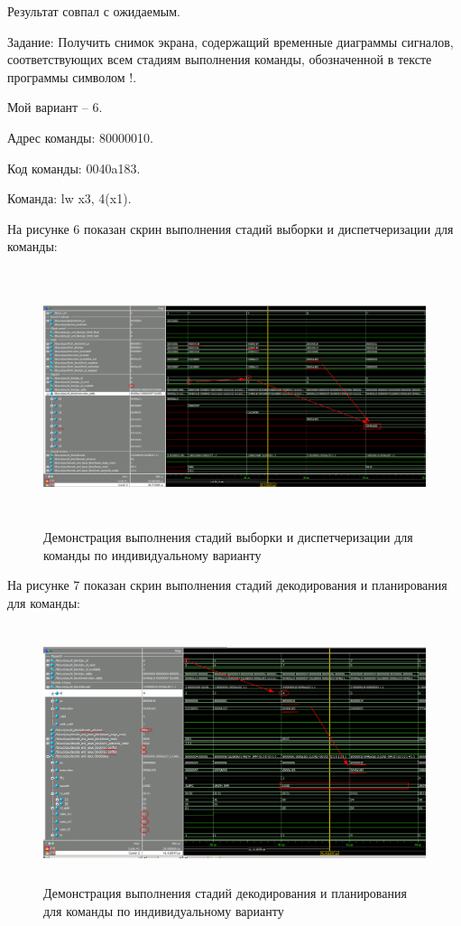 Результат совпал с ожидаемым.

Задание: Получить снимок экрана, содержащий временные диаграммы сигналов, соответствующих всем стадиям выполнения команды, обозначенной в тексте программы символом !.

Мой вариант -- 6.

Адрес команды: 80000010. 

Код команды: 0040a183. 

Команда: lw x3, 4(x1).

На рисунке 6 показан скрин выполнения стадий выборки и диспетчеризации для команды:
\FloatBarrier
\begin{figure}[h]
	\begin{center}
		\includegraphics[width=\linewidth, height=7.5cm]{inc/first_my.png}
	\end{center}
	\caption{Демонстрация выполнения стадий выборки и диспетчеризации для команды по индивидуальному варианту}
\end{figure}
\FloatBarrier

На рисунке 7 показан скрин выполнения стадий декодирования и планирования для команды:
\FloatBarrier
\begin{figure}[h]
	\begin{center}
		\includegraphics[width=\linewidth, height=7.5cm]{inc/second_my.png}
	\end{center}
	\caption{Демонстрация выполнения стадий декодирования и планирования для команды по индивидуальному варианту}
\end{figure}
\FloatBarrier


